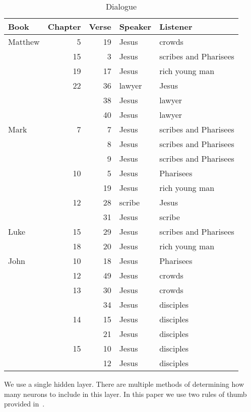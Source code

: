 \documentclass{article}
\begin{document}
\begin{table}
    \centering
    \renewcommand\arraystretch{1.3}
    \begin{tabular}{@{}lrrll@{}}
    \toprule
        Book & Chapter & Verse & Speaker & Listener \\
    \midrule
        Matthew & 5 & 19 & Jesus & crowds \\
         & 15 & 3 & Jesus & scribes and Pharisees \\
         & 19 & 17 & Jesus & rich young man \\
         & 22 & 36 & lawyer & Jesus \\
         &  & 38 & Jesus & lawyer \\
         &  & 40 & Jesus & lawyer \\
        Mark & 7 & 7 & Jesus & scribes and Pharisees \\
         &  & 8 & Jesus & scribes and Pharisees \\
         &  & 9 & Jesus & scribes and Pharisees \\
         & 10 & 5 & Jesus & Pharisees \\
         & & 19 & Jesus & rich young man \\
         & 12 & 28 & scribe & Jesus \\
         & & 31 & Jesus & scribe \\
        Luke & 15 & 29& Jesus & scribes and Pharisees \\
        & 18 & 20 & Jesus & rich young man \\
        John & 10 & 18 & Jesus & Pharisees \\
         & 12 & 49 & Jesus & crowds \\
         & 13 & 30 & Jesus & crowds \\
         & & 34 & Jesus & disciples \\
         & 14 & 15 & Jesus & disciples \\
         & & 21 & Jesus & disciples \\
         & 15 & 10 & Jesus & disciples \\
         & & 12 & Jesus & disciples \\
    \bottomrule
    \end{tabular}
    \caption{Dialogue}
    \label{dialogue}
\end{table}

We use a single hidden layer.  There are multiple methods of determining how many neurons
to include in this layer.  In this paper we use two rules of thumb provided in~\cite{Heaton2008}.
\end{document}
